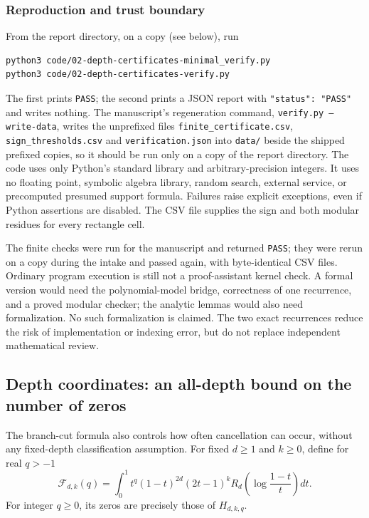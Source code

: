 \documentclass[11pt,a4paper]{article}
\numberwithin{equation}{section}
\theoremstyle{definition}
\theoremstyle{remark}
\theoremstyle{plain}
\begin{document}
\subsubsection{Reproduction and trust boundary}
From the report directory, on a copy (see below), run
\begin{lstlisting}
python3 code/02-depth-certificates-minimal_verify.py
python3 code/02-depth-certificates-verify.py
\end{lstlisting}
The first prints \texttt{PASS}; the second prints a JSON report with
\texttt{"status": "PASS"} and writes nothing.  The manuscript's regeneration
command, \texttt{verify.py --write-data}, writes the unprefixed files
\texttt{finite\_certificate.csv}, \texttt{sign\_thresholds.csv} and
\texttt{verification.json} into \texttt{data/} beside the shipped prefixed
copies, so it should be run only on a copy of the report directory.
The code uses only Python's standard library and arbitrary-precision
integers.  It uses no floating point, symbolic algebra library, random
search, external service, or precomputed presumed support formula.
Failures raise explicit exceptions, even if Python assertions are
disabled.  The CSV file supplies the sign and both modular residues for
every rectangle cell.

The finite checks were run for the manuscript and returned \texttt{PASS}; they
were rerun on a copy during the intake and passed again, with byte-identical
CSV files.  Ordinary program execution is still not a proof-assistant kernel
check.  A formal version would need the polynomial-model bridge, correctness
of one recurrence, and a proved modular checker; the analytic lemmas would
also need formalization.  No such formalization is claimed.  The two exact
recurrences reduce the risk of implementation or indexing error, but do not
replace independent mathematical review.

\subsection{Depth coordinates: an all-depth bound on the number of zeros}\label{xxb:dc:sec:zero-count}

The branch-cut formula also controls how often cancellation can occur,
without any fixed-depth classification assumption.
For fixed $d\ge1$ and $k\ge0$, define for real $q>-1$
\begin{equation}\label{xxb:dc:eq:Mellin}
 \mathcal F_{d,k}(q)=\int_0^1 t^q(1-t)^{2d}(2t-1)^k
 R_d\!\left(\log\frac{1-t}{t}\right)dt.
\end{equation}
For integer $q\ge0$, its zeros are precisely those of $H_{d,k,q}$.
\end{document}
